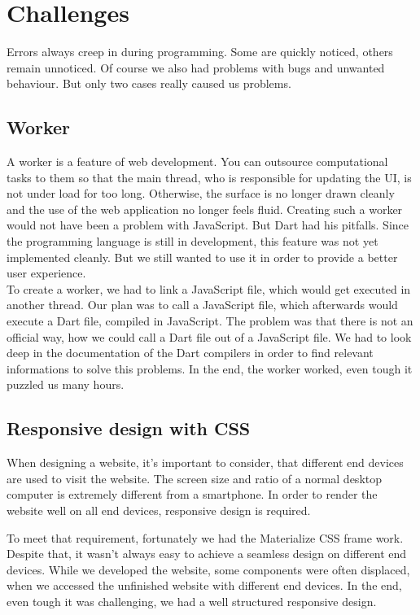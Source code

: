 \section{Challenges}
Errors always creep in during programming. Some are quickly noticed, others remain unnoticed. Of course we also had problems with bugs and unwanted behaviour. But only two cases really caused us problems.

\subsection{Worker}
A worker is a feature of web development. You can outsource computational tasks to them so that the main thread, who is responsible for updating the UI, is not under load for too long. Otherwise, the surface is no longer drawn cleanly and the use of the web application no longer feels fluid. Creating such a worker would not have been a problem with JavaScript. But Dart had his pitfalls. Since the programming language is still in development, this feature was not yet implemented cleanly. But we still wanted to use it in order to provide a better user experience.\\
To create a worker, we had to link a JavaScript file, which would get executed in another thread. Our plan was to call a JavaScript file, which afterwards would execute a Dart file, compiled in JavaScript. The problem was that there is not an official way, how we could call a Dart file out of a JavaScript file. We had to look deep in the documentation of the Dart compilers in order to find relevant informations to solve this problems. In the end, the worker worked, even tough it puzzled us many hours.

\subsection{Responsive design with CSS}
When designing a website, it's important to consider, that different end devices are used to visit the website. The screen size and ratio of a normal desktop computer is extremely different from a smartphone. In order to render the website well on all end devices, \ac{responsive} design is required. 

To meet that requirement, fortunately we had the Materialize CSS frame work. Despite that, it wasn't always easy to achieve a seamless design on different end devices. While we developed the website, some components were often displaced, when we accessed the unfinished website with different end devices. 
In the end, even tough it was challenging, we had a well structured responsive design.


